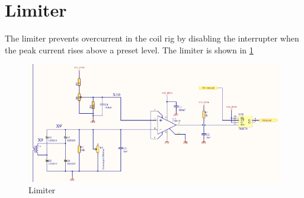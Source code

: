 


\newpage
\section{Limiter}
\label{sec:limiter}

The limiter prevents overcurrent in the coil rig by disabling the interrupter when the peak current rises above a preset level. The limiter is shown in \cref{fig:limiter}

\begin{figure}[h!]
    \centering
    \includegraphics[width=\textwidth]{Skjema/TK513_Limiter.pdf}
    \caption{Limiter}
    \label{fig:limiter}
\end{figure}

